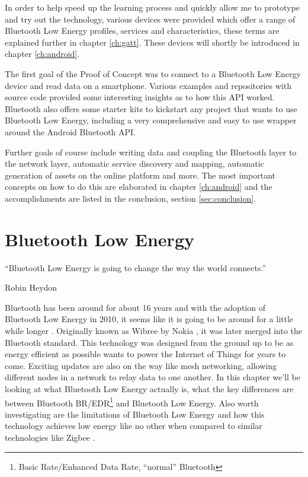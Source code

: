 \documentclass[pdftex,a4paper,12pt,twoside]{report}
\begin{document}
In order to help speed up the learning process and quickly allow me to prototype and try out the technology, various devices were provided which offer a range of Bluetooth Low Energy profiles, services and characteristics, these terms are explained further in chapter \ref{ch:gatt}. These devices will shortly be introduced in chapter \ref{ch:android}.

The first goal of the Proof of Concept was to connect to a Bluetooth Low Energy device and read data on a smartphone. Various examples and repositories with source code provided some interesting insights as to how this API worked. Bluetooth also offers some starter kits to kickstart any project that wants to use Bluetooth Low Energy, including a very comprehensive and easy to use wrapper around the Android Bluetooth API.

Further goals of course include writing data and coupling the Bluetooth layer to the network layer, automatic service discovery and mapping, automatic generation of assets on the online platform and more. The most important concepts on how to do this are elaborated in chapter \ref{ch:android} and the accomplishments are listed in the conclusion, section \ref{sec:conclusion}.




\chapter{Bluetooth Low Energy}
\label{ch:ble}
\epigraph{``Bluetooth Low Energy is going to change the way the world connects.''}{Robin Heydon}
Bluetooth has been around for about 16 years and with the adoption of Bluetooth Low Energy in 2010, it seems like it is going to be around for a little while longer \citep{bluetoothsig2016}. Originally known as Wibree by Nokia \citep{nokia2006}, it was later merged into the Bluetooth standard. This technology was designed from the ground up \citep{gupta2013inside} to be as energy efficient as possible wants to power the Internet of Things for years to come. Exciting updates are also on the way like mesh networking, allowing different nodes in a network to relay data to one another. In this chapter we'll be looking at what Bluetooth Low Energy actually is, what the key differences are between Bluetooth BR/EDR\footnote{Basic Rate/Enhanced Data Rate, ``normal'' Bluetooth} and Bluetooth Low Energy. Also worth investigating are the limitations of Bluetooth Low Energy and how this technology achieves low energy like no other when compared to similar technologies like Zigbee \citep{siekkinen2012low}.
\end{document}
